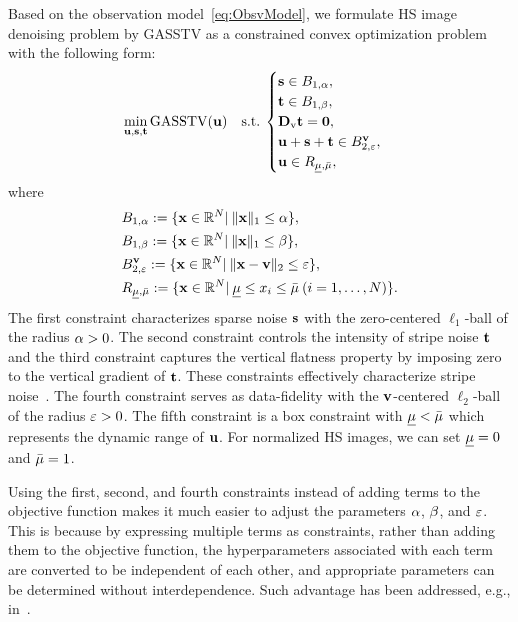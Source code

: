 Based on the observation model~\eqref{eq:ObsvModel}, we formulate HS image denoising problem by GASSTV as a constrained convex optimization problem with the following form:
\begin{equation}
    \label{prob:OptimProb}
    \min_{\mathbf{u}, \mathbf{s}, \mathbf{t}} \text{GASSTV}(\mathbf{u}) \quad \mathrm{s.t.} \: 
    \begin{cases}
        \mathbf{s} \in B_{1, \alpha}, \\
        \mathbf{t} \in B_{1, \beta}, \\
        \mathbf{D}_{\text{v}} \mathbf{t} = \mathbf{0}, \\
        \mathbf{u} + \mathbf{s} + \mathbf{t} \in B_{2, \varepsilon}^{\mathbf{v}}, \\
        \mathbf{u} \in R_{\underline{\mu},\bar{\mu}}, \\
    \end{cases}
\end{equation}
where
\begin{align}
	\label{eq:constraint_sparse}
	&B_{1, \alpha} := \{ \mathbf{x} \in \mathbb{R}^{N} | \:
	\|\mathbf{x}\|_{1} \leq \alpha \},  \\
	\label{eq:constraint_stripe}
	&B_{1, \beta} := \{ \mathbf{x} \in \mathbb{R}^{N} | \:
	\|\mathbf{x}\|_{1} \leq \beta \},  \\
	\label{eq:constraint_fidel}
	&B_{2, \varepsilon}^{\mathbf{v}} := \{ \mathbf{x} \in \mathbb{R}^{N} | \:
	\|\mathbf{x} - \mathbf{v}\|_2 \leq \varepsilon \},  \\
	\label{eq:constraint_box}
	&R_{\underline{\mu},\bar{\mu}} := \{ \mathbf{x} \in \mathbb{R}^{N} | \:
	\underline{\mu} \leq x_{i} \leq \bar{\mu}  \: (i = 1, \dots , N) \}.
\end{align}
The first constraint characterizes sparse noise $\mathbf{s}$ with the zero-centered $\ell_1$-ball of the radius $\alpha > 0$. The second constraint controls the intensity of stripe noise $\mathbf{t}$ and the third constraint captures the vertical flatness property by imposing zero to the vertical gradient of $\mathbf{t}$. These constraints effectively characterize stripe noise~\cite{Naganuma2022Destriping}. The fourth constraint serves as data-fidelity with the $\mathbf{v}$-centered $\ell_2$-ball of the radius $\varepsilon > 0$. The fifth constraint is a box constraint with $\underline{\mu} < \bar{\mu}$ which represents the dynamic range of $\mathbf{u}$. For normalized HS images, we can set $\underline{\mu} = 0$ and $\bar{\mu} = 1$.


Using the first, second, and fourth constraints instead of adding terms to the objective function makes it much easier to adjust the parameters $\alpha$, $\beta$, and $\varepsilon$. This is because by expressing multiple terms as constraints, rather than adding them to the objective function, the hyperparameters associated with each term are converted to be independent of each other, and appropriate parameters can be determined without interdependence. Such advantage has been addressed, e.g., in~\cite{Afonso2011Constraint, Chierchia2015Constraint, Ono2015Constraint, Ono2017Constraint, Ono2019Constraint}.

